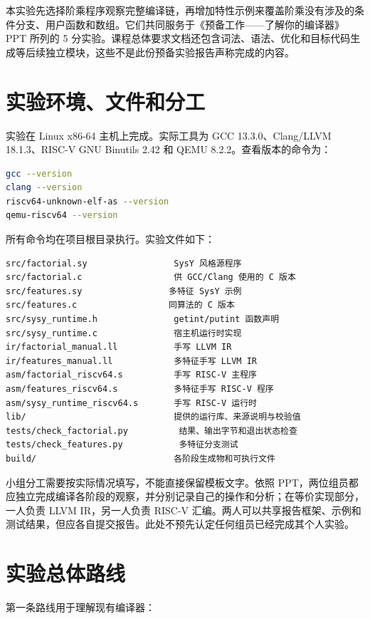 \documentclass[UTF8,a4paper,12pt]{ctexart}
\begin{document}
本实验先选择阶乘程序观察完整编译链，再增加特性示例来覆盖阶乘没有涉及的条件分支、用户函数和数组。它们共同服务于《预备工作——了解你的编译器》PPT 所列的 5 分实验。课程总体要求文档还包含词法、语法、优化和目标代码生成等后续独立模块，这些不是此份预备实验报告声称完成的内容。

\section{实验环境、文件和分工}

实验在 Linux x86-64 主机上完成。实际工具为 GCC 13.3.0、Clang/LLVM 18.1.3、RISC-V GNU Binutils 2.42 和 QEMU 8.2.2。查看版本的命令为：

\begin{lstlisting}[language=bash]
gcc --version
clang --version
riscv64-unknown-elf-as --version
qemu-riscv64 --version
\end{lstlisting}

所有命令均在项目根目录执行。实验文件如下：

\begin{lstlisting}
src/factorial.sy                 SysY 风格源程序
src/factorial.c                  供 GCC/Clang 使用的 C 版本
src/features.sy                 多特征 SysY 示例
src/features.c                  同算法的 C 版本
src/sysy_runtime.h               getint/putint 函数声明
src/sysy_runtime.c               宿主机运行时实现
ir/factorial_manual.ll           手写 LLVM IR
ir/features_manual.ll            多特征手写 LLVM IR
asm/factorial_riscv64.s          手写 RISC-V 主程序
asm/features_riscv64.s           多特征手写 RISC-V 程序
asm/sysy_runtime_riscv64.s       手写 RISC-V 运行时
lib/                             提供的运行库、来源说明与校验值
tests/check_factorial.py          结果、输出字节和退出状态检查
tests/check_features.py           多特征分支测试
build/                           各阶段生成物和可执行文件
\end{lstlisting}

小组分工需要按实际情况填写，不能直接保留模板文字。依照 PPT，两位组员都应独立完成编译各阶段的观察，并分别记录自己的操作和分析；在等价实现部分，一人负责 LLVM IR，另一人负责 RISC-V 汇编。两人可以共享报告框架、示例和测试结果，但应各自提交报告。此处不预先认定任何组员已经完成其个人实验。

\section{实验总体路线}

第一条路线用于理解现有编译器：
\end{document}
